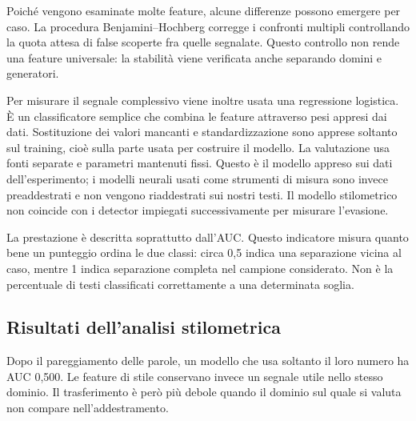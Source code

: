 Poiché vengono esaminate molte feature, alcune differenze possono emergere per caso. La procedura Benjamini--Hochberg corregge i confronti multipli controllando la quota attesa di false scoperte fra quelle segnalate. Questo controllo non rende una feature universale: la stabilità viene verificata anche separando domini e generatori.

Per misurare il segnale complessivo viene inoltre usata una regressione logistica. È un classificatore semplice che combina le feature attraverso pesi appresi dai dati. Sostituzione dei valori mancanti e standardizzazione sono apprese soltanto sul training, cioè sulla parte usata per costruire il modello. La valutazione usa fonti separate e parametri mantenuti fissi. Questo è il modello appreso sui dati dell'esperimento; i modelli neurali usati come strumenti di misura sono invece preaddestrati e non vengono riaddestrati sui nostri testi. Il modello stilometrico non coincide con i detector impiegati successivamente per misurare l'evasione.

La prestazione è descritta soprattutto dall'AUC. Questo indicatore misura quanto bene un punteggio ordina le due classi: circa 0,5 indica una separazione vicina al caso, mentre 1 indica separazione completa nel campione considerato. Non è la percentuale di testi classificati correttamente a una determinata soglia.

\subsection{Risultati dell'analisi stilometrica}\label{risultati-dellanalisi-stilometrica}

Dopo il pareggiamento delle parole, un modello che usa soltanto il loro numero ha AUC 0,500. Le feature di stile conservano invece un segnale utile nello stesso dominio. Il trasferimento è però più debole quando il dominio sul quale si valuta non compare nell'addestramento.

